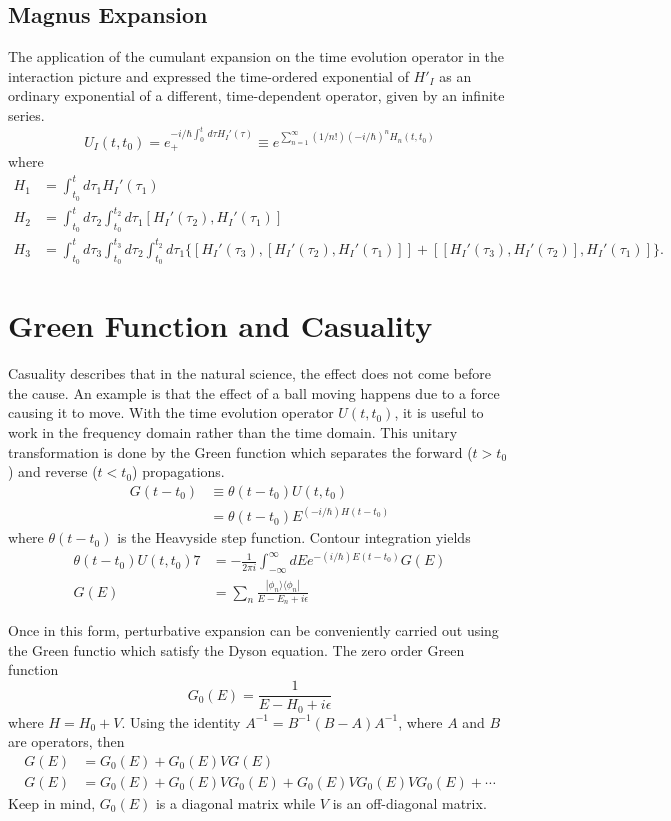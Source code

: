 \documentclass{article}
\begin{document}
\subsection{Magnus Expansion}
The application of the cumulant expansion on the time evolution operator in the
interaction picture and expressed the time-ordered exponential of $H'_I$ as an
ordinary exponential of a different, time-dependent operator, given by an infinite
series.
\begin{equation}
  U_I(t,t_0) = e_+^{-i/\hbar\int_0^t\,d\tau H_I'(\tau)} \equiv
    e^{\sum_{n=1}^{\infty}(1/n!)(-i/\hbar)^nH_n(t,t_0)}
\end{equation}
where
\begin{align}
  H_1 & = \int_{t_0}^t d\tau_1 H_I'(\tau_1) \\
  H_2 & = \int_{t_0}^t d\tau_2 \int_{t_0}^{t_2} d\tau_1 [H_I'(\tau_2),H_I'(\tau_1)] \\
  H_3 & = \int_{t_0}^t d\tau_3 \int_{t_0}^{t_3} d\tau_2 \int_{t_0}^{t_2} d\tau_1
  \{[H_I'(\tau_3),[H_I'(\tau_2),H_I'(\tau_1)]] + [[H_I'(\tau_3),H_I'(\tau_2)],H_I'(\tau_1)]\}.
\end{align}

\section{Green Function and Casuality}
Casuality describes that in the natural science, the effect does not come before
the cause. An example is that the effect of a ball moving happens due to a force
causing it to move. With the time evolution operator $U(t,t_0)$, it is useful to
work in the frequency domain rather than the time domain. This unitary transformation
is done by the Green function which separates the forward ($t>t_0$) and reverse ($t<t_0$)
propagations.
\begin{align}
  G(t-t_0) & \equiv \theta(t-t_0)U(t,t_0) \\
  & = \theta(t-t_0)E^{(-i/\hbar)H(t-t_0)} \nonumber
\end{align}
where $\theta(t-t_0)$ is the Heavyside step function. Contour integration yields
\begin{align}
  \theta(t-t_0)U(t,t_0) 7 & = -\frac{1}{2\pi i}\int_{-\infty}^{\infty} dE e^{-(i/\hbar)E(t-t_0)}G(E) \\
  G(E) & = \sum_n \frac{|\phi_n\rangle\langle\phi_n|}{E-E_n+i\epsilon}
\end{align}

Once in this form, perturbative expansion can be conveniently carried out using
the Green functio which satisfy the Dyson equation. The zero order Green function
\begin{equation}
  G_0(E) = \frac{1}{E-H_0+i\epsilon}
\end{equation}
where $H = H_0 + V$. Using the identity $A^{-1} = B^{-1}(B-A)A^{-1}$, where
$A$ and $B$ are operators, then
\begin{align}
  G(E) & = G_0(E) + G_0(E)VG(E) \\
  G(E) & = G_0(E) + G_0(E)VG_0(E) + G_0(E)VG_0(E)VG_0(E) + \cdots
\end{align}
Keep in mind, $G_0(E)$ is a diagonal matrix while $V$ is an off-diagonal matrix.
\end{document}
